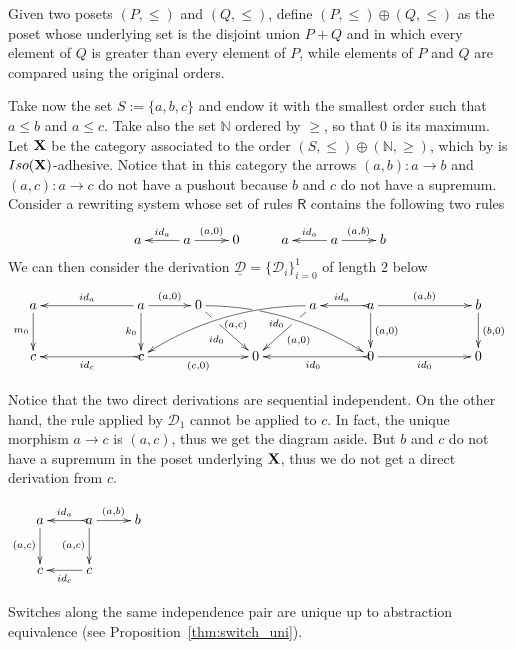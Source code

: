 \documentclass[a4paper,UKenglish,cleveref,pdftex,thm-restate,numberwithinsect,anonymous]{lipics}
\newcommand{\id}[1]{\mathsf{id}_{#1}}
\def\R{\mathsf{R}}
\def\X{\textbf {\textup{X}}}
\newcommand{\dder}[1]{\mathscr{#1}}
\newcommand{\der}[1]{\underline{\dder{#1}}}
\begin{document}
\begin{example}
  \label{ex:diff1}
  Given two posets $(P, \leq)$ and $(Q, \leq)$, define
  $(P, \leq)\oplus(Q,\leq)$ as the poset whose underlying set is
  the disjoint union $P+Q$ and in which every element of $Q$ is
  greater than every element of $P$, while elements of $P$ and $Q$ are
  compared using the original orders.

  Take now the set $S:=\{a,b,c\}$ and endow it with the smallest order
  such that $a\leq b$ and $a\leq c$.  Take also the set $\mathbb{N}$
  ordered by $\geq$, so that $0$ is its maximum.  Let $\X$ be the
  category associated to the order
  $(S, \leq)\oplus (\mathbb{N}, \geq)$, which by  is
  $\mathsf{Iso(\X)}$-adhesive. Notice that in this category the arrows
  $(a,b)\colon a\to b$ and $(a,c)\colon a\to c$ do not have a pushout
  because $b$ and $c$ do not have a supremum.  Consider a rewriting
  system whose set of rules $\R$ contains the following two rules
  \[\xymatrix{a & a \ar[r]^{(a, 0)} \ar[l]_{\id{a}} & 0 & a & a
      \ar[r]^{(a, b)} \ar[l]_{\id{a}} & b }\]
  We can then consider the  derivation
  $\der{D}=\{\dder{D}_i\}_{i=0}^1$ of length $2$ below
  \[
    \xymatrix@C=30pt{a \ar[d]_{m_0}&& a \ar[d]_{k_0}\ar[ll]_{\id{a}}
      \ar[r]^{(a,0)} & 0 \ar@/^.35cm/[drrr]|(.315)\hole_(.45){\id{0}}
      \ar[dr]|(.3)\hole_{\id{0}} && a \ar@/_.35cm/[dlll]^(.45){(a,c)}
      \ar[dl]|(.3)\hole^{(a,0)}& a \ar[d]^{(a,0)}\ar@{>->}[l]_{\id{a}}
      \ar[rr]^{(a,b)} && b \ar[d]^{(b,0)}\\c &&
      \ar@{>->}[ll]^{\id{c}} c \ar[rr]_{(c,0)}&& 0 &&
      \ar@{>->}[ll]^{\id{0}} 0 \ar[rr]_{\id{0}}&& 0}\]

  \noindent
  \parbox{10cm}{ \hspace{15pt} Notice that the two
    direct derivations are sequential independent.
    On the other hand, the rule
    applied by $\dder{D}_1$ cannot be applied to $c$. In fact, the
    unique morphism $a\to c$ is $(a,c)$, thus we get the diagram
    aside. But $b$ and $c$ do not have a supremum in the poset
    underlying $\X$, thus we do not get a direct derivation from
    $c$.}  \parbox{3cm}{
    \vspace{-.3cm}$\xymatrix{a \ar[d]_{(a,c)}& a
      \ar[d]_{(a,c)}\ar@{>->}[l]_{\id{a}} \ar[r]^{(a,b)} & b \\c
      & c \ar[l]^{\id{c}} }$}  
\end{example}

\iffalse 

Switches along the same independence pair are unique up to abstraction
equivalence (see Proposition~\ref{thm:switch_uni}).
\end{document}
